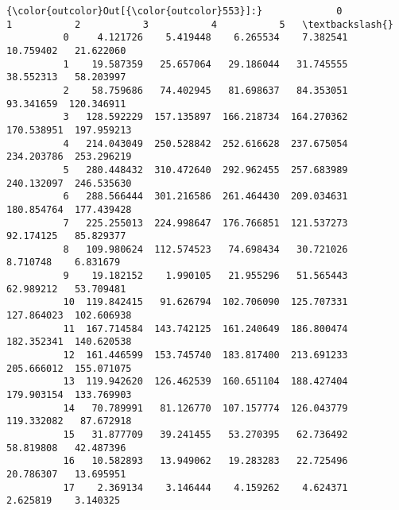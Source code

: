\documentclass[11pt]{article}
\begin{document}
\begin{Verbatim}[commandchars=\\\{\}]
{\color{outcolor}Out[{\color{outcolor}553}]:}             0           1           2           3           4           5   \textbackslash{}
          0     4.121726    5.419448    6.265534    7.382541   10.759402   21.622060   
          1    19.587359   25.657064   29.186044   31.745555   38.552313   58.203997   
          2    58.759686   74.402945   81.698637   84.353051   93.341659  120.346911   
          3   128.592229  157.135897  166.218734  164.270362  170.538951  197.959213   
          4   214.043049  250.528842  252.616628  237.675054  234.203786  253.296219   
          5   280.448432  310.472640  292.962455  257.683989  240.132097  246.535630   
          6   288.566444  301.216586  261.464430  209.034631  180.854764  177.439428   
          7   225.255013  224.998647  176.766851  121.537273   92.174125   85.829377   
          8   109.980624  112.574523   74.698434   30.721026    8.710748    6.831679   
          9    19.182152    1.990105   21.955296   51.565443   62.989212   53.709481   
          10  119.842415   91.626794  102.706090  125.707331  127.864023  102.606938   
          11  167.714584  143.742125  161.240649  186.800474  182.352341  140.620538   
          12  161.446599  153.745740  183.817400  213.691233  205.666012  155.071075   
          13  119.942620  126.462539  160.651104  188.427404  179.903154  133.769903   
          14   70.789991   81.126770  107.157774  126.043779  119.332082   87.672918   
          15   31.877709   39.241455   53.270395   62.736492   58.819808   42.487396   
          16   10.582893   13.949062   19.283283   22.725496   20.786307   13.695951   
          17    2.369134    3.146444    4.159262    4.624371    2.625819    3.140325   
          

\end{Verbatim}
\end{document}
